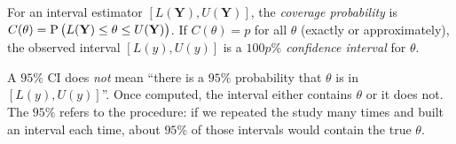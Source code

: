 \begin{definition}
For an interval estimator $[L(\mathbf Y), U(\mathbf Y)]$, the \emph{coverage probability}
is $C(\theta) = \operatorname{P}\big(L(\mathbf Y)\le\theta\le U(\mathbf Y)\big)$. If $C(\theta) = p$
for all $\theta$ (exactly or approximately), the observed interval $[L(y),U(y)]$ is a
\emph{$100p\%$ confidence interval} for $\theta$.
\end{definition}

\begin{important}
A $95\%$ CI does \emph{not} mean ``there is a $95\%$ probability that $\theta$ is in
$[L(y),U(y)]$''. Once computed, the interval either contains $\theta$ or it does not. The
$95\%$ refers to the procedure: if we repeated the study many times and built an interval
each time, about $95\%$ of those intervals would contain the true $\theta$.
\end{important}

